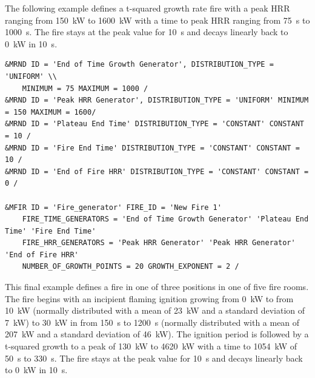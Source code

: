\documentclass[12pt,twoside]{book}
\begin{document}
The following example defines a t-squared growth rate fire with a peak HRR ranging from 150~kW to 1600~kW with a time to peak HRR ranging from 75~s to 1000~s. The fire stays at the peak value for 10~s and decays linearly back to 0~kW in 10~s.

\begin{lstlisting}[language=cdata, basicstyle=\scriptsize]
&MRND ID = 'End of Time Growth Generator', DISTRIBUTION_TYPE = 'UNIFORM' \\
    MINIMUM = 75 MAXIMUM = 1000 /
&MRND ID = 'Peak HRR Generator', DISTRIBUTION_TYPE = 'UNIFORM' MINIMUM = 150 MAXIMUM = 1600/
&MRND ID = 'Plateau End Time' DISTRIBUTION_TYPE = 'CONSTANT' CONSTANT = 10 /
&MRND ID = 'Fire End Time' DISTRIBUTION_TYPE = 'CONSTANT' CONSTANT = 10 /
&MRND ID = 'End of Fire HRR' DISTRIBUTION_TYPE = 'CONSTANT' CONSTANT = 0 /

&MFIR ID = 'Fire_generator' FIRE_ID = 'New Fire 1'
    FIRE_TIME_GENERATORS = 'End of Time Growth Generator' 'Plateau End Time' 'Fire End Time'
    FIRE_HRR_GENERATORS = 'Peak HRR Generator' 'Peak HRR Generator' 'End of Fire HRR'
    NUMBER_OF_GROWTH_POINTS = 20 GROWTH_EXPONENT = 2 /
\end{lstlisting}

This final example defines a fire in one of three positions in one of five fire rooms. The fire begins with an incipient flaming ignition growing from 0~kW to from 10~kW (normally distributed with a mean of 23~kW and a standard deviation of 7~kW) to 30~kW in from 150~s to 1200~s (normally distributed with a mean of 207~kW and a standard deviation of 46~kW). The ignition period is followed by a t-squared growth to a peak of 130~kW to 4620~kW with a time to 1054~kW of 50~s to 330~s. The fire stays at the peak value for 10~s and decays linearly back to 0~kW in 10~s.
\end{document}
